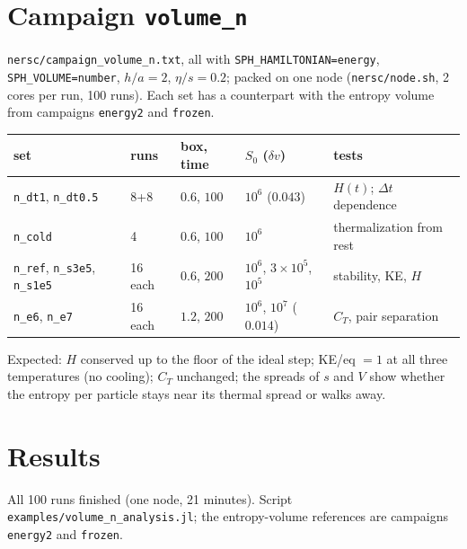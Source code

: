 \documentclass[11pt,aps,preprint,nofootinbib,superscriptaddress,tightenlines]{revtex4-2}
\begin{document}
\section{Campaign \texttt{volume\_n}}
\label{sec:campaign}

\texttt{nersc/campaign\_volume\_n.txt}, all with \texttt{SPH\_HAMILTONIAN=energy},
\texttt{SPH\_VOLUME=number}, $h/a=2$, $\eta/s=0.2$; packed on one node
(\texttt{nersc/node.sh}, 2 cores per run, 100 runs).  Each set has a counterpart with
the entropy volume from campaigns \texttt{energy2} and \texttt{frozen}.
\begin{center}
\begin{tabular}{lllll}
\hline
set & runs & box, time & $S_0$ ($\delta v$) & tests \\ \hline
\texttt{n\_dt1}, \texttt{n\_dt0.5} & 8+8 & $0.6$, $100$ & $10^6$ ($0.043$) & $H(t)$; $\Delta t$ dependence \\
\texttt{n\_cold} & 4 & $0.6$, $100$ & $10^6$ & thermalization from rest \\
\texttt{n\_ref}, \texttt{n\_s3e5}, \texttt{n\_s1e5} & 16 each & $0.6$, $200$ & $10^6$, $3\times10^5$, $10^5$ & stability, KE, $H$ \\
\texttt{n\_e6}, \texttt{n\_e7} & 16 each & $1.2$, $200$ & $10^6$, $10^7$ ($0.014$) & $C_T$, pair separation \\
\hline
\end{tabular}
\end{center}
Expected: $H$ conserved up to the floor of the ideal step; KE/eq $=1$ at all three
temperatures (no cooling); $C_T$ unchanged; the spreads of $s$ and $V$ show whether the
entropy per particle stays near its thermal spread or walks away.

\section{Results}
\label{sec:results}

All 100 runs finished (one node, 21 minutes).  Script
\texttt{examples/volume\_n\_analysis.jl}; the entropy-volume references are campaigns
\texttt{energy2} and \texttt{frozen}.
\end{document}
